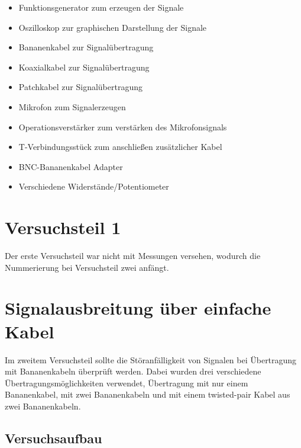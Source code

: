 \documentclass[12pt,a4paper]{article}
\begin{document}
\begin{itemize}
\item	Funktionsgenerator zum erzeugen der Signale

\item	Oszilloskop zur graphischen Darstellung der Signale

\item	Bananenkabel zur Signalübertragung

\item	Koaxialkabel zur Signalübertragung

\item	Patchkabel zur Signalübertragung

\item	Mikrofon zum Signalerzeugen

\item	Operationsverstärker zum verstärken des Mikrofonsignals

\item	T-Verbindungsstück zum anschließen zusätzlicher Kabel

\item	BNC-Bananenkabel Adapter

\item 	Verschiedene Widerstände/Potentiometer

\end{itemize}

\section{Versuchsteil 1}
Der erste Versuchsteil war nicht mit Messungen versehen, wodurch die Nummerierung bei Versuchsteil zwei anfängt.

\section{Signalausbreitung über einfache Kabel}
Im zweitem Versuchsteil sollte die Störanfälligkeit von Signalen bei Übertragung mit Bananenkabeln überprüft werden. Dabei wurden drei verschiedene Übertragungsmöglichkeiten verwendet, Übertragung mit nur einem Bananenkabel, mit zwei Bananenkabeln und mit einem twisted-pair Kabel aus zwei Bananenkabeln.
\subsection{Versuchsaufbau}
\end{document}
